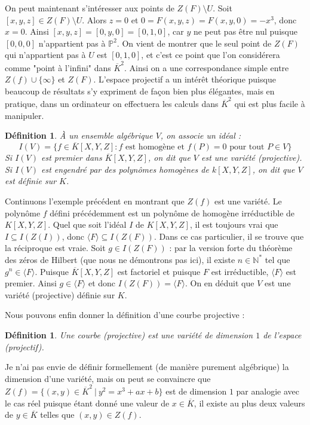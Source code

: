 \documentclass{article}
\theoremstyle{plain}%
\newtheorem{deff}[thm]{Définition}
\theoremstyle{definition}%
\newcommand{\N}{\mathbb{N}}
\newcommand{\ol}{\overline}
\begin{document}
On peut maintenant s'intéresser aux points de $Z(F)\setminus U$. Soit $[x, y, z]\in Z(F)\setminus U$. Alors $z=0$ et $0 = F(x,y, z) = F(x, y, 0) = -x^3$, donc $x=0$. Ainsi $[x, y, z] = [0, y, 0] = [0, 1, 0]$, car $y$ ne peut pas être nul puisque $[0, 0, 0]$ n'appartient pas à $\mathbb P^2$. On vient de montrer que le seul point de $Z(F)$ qui n'appartient pas à $U$ est $[0, 1, 0]$, et c'est ce point que l'on considérera comme "point à l'infini" dans $\ol K^2$. Ainsi on a une correspondance simple entre $Z(f) \cup \{\infty\}$ et $Z(F)$.
L'espace projectif a un intérêt théorique puisque beaucoup de résultats s'y expriment de façon bien plus élégantes, mais en pratique, dans un ordinateur on effectuera les calculs dans $\ol K^2$ qui est plus facile à manipuler.

\begin{deff}
  À un ensemble algébrique $V$, on associe un idéal :
  $$I(V) = \{ f\in \overline{K}[X, Y, Z] : f \text{ est homogène et } f(P) = 0 \text{ pour tout } P\in V \}$$
  Si $I(V)$ est premier dans $ \overline{K}[X, Y, Z] $, on dit que $V$ est une variété (projective). Si $I(V)$ est engendré par des polynômes homogènes de $k[X, Y, Z]$, on dit que $V$ est définie sur $K$.  
\end{deff}


Continuons l'exemple précédent en montrant que $Z(f)$ est une variété.
  Le polynôme $f$ défini précédemment est un polynôme de homogène irréductible de $K[X, Y, Z]$.   
  Quel que soit l'idéal $I$ de $K[X, Y, Z]$, il est toujours vrai que $I \subseteq I(Z(I))$, donc $\langle F \rangle \subseteq I(Z( F ))$. 
  Dans ce cas particulier, il se trouve que la réciproque est vraie. Soit $g\in I(Z(F))$ : par la version forte du théorème des zéros de Hilbert (que nous ne démontrons pas ici), il existe $n\in\N^*$ tel que $g^n\in \langle F \rangle$.
  Puisque $\ol K[X, Y, Z]$ est factoriel et puisque $F$ est irréductible,  $\langle F \rangle$ est premier. Ainsi $g\in \langle F \rangle$ et donc $I(Z(F)) = \langle F \rangle$.
  On en déduit que $V$ est une variété (projective) définie sur $K$.

  Nous pouvons enfin donner la définition d'une courbe projective :

\begin{deff}
  Une courbe (projective) est une variété de dimension $1$ de l'espace (projectif).
\end{deff}


Je n'ai pas envie de définir formellement (de manière purement algébrique) la dimension d'une variété, mais on peut se convaincre que $Z(f) = \{(x, y)\in \ol K^2\ |\ y^2 = x^3 + ax + b\}$ est de dimension $1$ par analogie avec le cas réel puisque étant donné une valeur de $x\in\ol K$, il existe au plus deux valeurs de $y\in\ol K$ telles que $(x, y)\in Z(f)$. 
\end{document}
